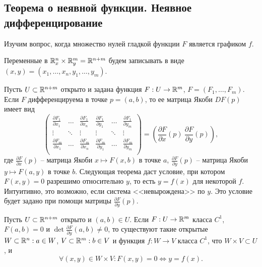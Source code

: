 \subsection{Теорема о неявной функции. Неявное дифференцирование}


Изучим вопрос, когда множество нулей гладкой функции $F$ является графиком $f$.

\vspace{5pt}

Переменные в $\mathbb{R}^n_x \times \mathbb{R}^m_y = \mathbb{R}^{n+m}$ будем записывать в виде $(x, y) = (x_1, \dotsc, x_n, y_1, \dotsc, y_m)$. 

Пусть $U \subset \mathbb{R}^{n+m}$ открыто и задана функция $F : U \to \mathbb{R}^m$, $F = (F_1, \dotsc, F_m)$. 
Если $F$ дифференцируема в точке $p = (a, b)$, то ее матрица Якоби $DF(p)$ имеет вид 
\[ \begin{pmatrix}
	\frac{\partial F_1}{\partial x_1} & \dotsc & \frac{\partial F_1}{\partial x_n} & \frac{\partial F_1}{\partial y_1} & \dotsc & \frac{\partial F_1}{\partial y_m} \\
	\vdots & \ddots & \vdots & \vdots & \ddots & \vdots \\ 
	\frac{\partial F_m}{\partial x_1} & \dotsc & \frac{\partial F_m}{\partial x_n} & \frac{\partial F_m}{\partial y_1} & \dotsc & \frac{\partial F_m}{\partial y_m} \\
\end{pmatrix} = \left( \dfrac{\partial F}{\partial x} (p) \ \dfrac{\partial F}{\partial y} (p) \right), \]
где $\frac{\partial F}{\partial x}(p)$ -- матрица Якоби $x \mapsto F(x, b)$ в точке $a$, $\frac{\partial F}{\partial y} (p)$ -- матрица Якоби $y \mapsto F(a, y)$ в точке $b$.
Следующая теорема даст условие, при котором $F(x, y) = 0$ разрешимо относительно $y$, то есть $y = f(x)$ для некоторой $f$. Интуитивно, это возможно, если система <<невырождена>> по $y$. Это условие будет задано при помощи матрицы $\frac{\partial F}{\partial y} (p)$.


\begin{theorem}
	Пусть $U \subset \mathbb{R}^{n+m}$ открыто и $(a, b) \in U$. 
	Если $F : U \to \mathbb{R}^m$ класса $C^1$, $F(a, b) = 0$ и $\det \frac{\partial F}{\partial y}(a, b) \neq 0$, то существуют такие открытые $W \subset \mathbb{R}^n: a \in W$, $V \subset \mathbb{R}^m: b \in V$ и функция $f : W \to V$ класса $C^1$, что 
	$W \times V \subset U$, и 
	\[ \forall (x, y) \in W \times V : F(x, y) = 0 \iff y = f(x). \]
\end{theorem}

